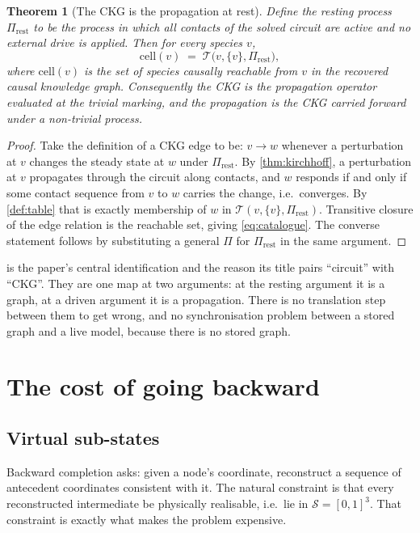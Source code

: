 \documentclass[11pt,twocolumn,a4paper]{article}
\theoremstyle{plain}
\newtheorem{theorem}{Theorem}[section]
\theoremstyle{definition}
\theoremstyle{remark}
\newcommand{\Sspace}{\mathcal{S}}
\newcommand{\Tmap}{\mathcal{T}}
\begin{document}
\begin{theorem}[The CKG is the propagation at rest]
\label{thm:catalogue}
Define the \emph{resting process} $\Pi_{\mathrm{rest}}$ to be the process in
which all contacts of the solved circuit are active and no external drive is
applied. Then for every species $v$,
\begin{equation}
\mathrm{cell}(v) \;=\; \Tmap\bigl(v,\{v\},\Pi_{\mathrm{rest}}\bigr),
\label{eq:catalogue}
\end{equation}
where $\mathrm{cell}(v)$ is the set of species causally reachable from $v$ in
the recovered causal knowledge graph. Consequently the CKG is the propagation
operator evaluated at the trivial marking, and the propagation is the CKG
carried forward under a non-trivial process.
\end{theorem}

\begin{proof}
Take the definition of a CKG edge to be: $v \to w$ whenever a perturbation at
$v$ changes the steady state at $w$ under $\Pi_{\mathrm{rest}}$. By
\cref{thm:kirchhoff}, a perturbation at $v$ propagates through the circuit
along contacts, and $w$ responds if and only if some contact sequence from $v$
to $w$ carries the change, i.e.\ converges. By \cref{def:table} that is exactly
membership of $w$ in $\Tmap(v,\{v\},\Pi_{\mathrm{rest}})$. Transitive closure
of the edge relation is the reachable set, giving \cref{eq:catalogue}. The
converse statement follows by substituting a general $\Pi$ for
$\Pi_{\mathrm{rest}}$ in the same argument.
\end{proof}

 is the paper's central identification and the reason its
title pairs ``circuit'' with ``CKG''. They are one map at two arguments: at the
resting argument it is a graph, at a driven argument it is a propagation. There
is no translation step between them to get wrong, and no synchronisation problem
between a stored graph and a live model, because there is no stored graph.

\section{The cost of going backward}
\label{sec:backward}

\subsection{Virtual sub-states}

Backward completion asks: given a node's coordinate, reconstruct a sequence of
antecedent coordinates consistent with it. The natural constraint is that every
reconstructed intermediate be physically realisable, i.e.\ lie in
$\Sspace = [0,1]^3$. That constraint is exactly what makes the problem
expensive.
\end{document}
